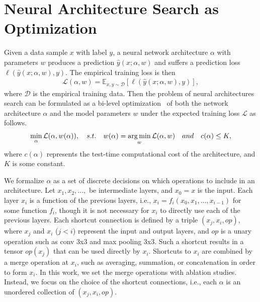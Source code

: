 \section{Neural Architecture Search as Optimization}

Given a data sample $x$ with label $y$, a neural network architecture $\alpha$ with parameters $w$ produces 
a prediction $\hat{y}(x ; \alpha, w)$ and suffers a prediction loss $\ell(\hat{y}(x ; \alpha, w), y)$.
The empirical training loss is then 
\begin{align}
\mathcal{L}(\alpha, w) = \mathbb{E} _{x, y \sim \mathcal{D}} [ \ell(\hat{y}(x ; \alpha, w), y) ] ,
\end{align}
where $\mathcal{D}$ is the empirical training data. 
Then the problem of neural architectures search can be formulated as a bi-level optimization~\citep{bilevel_opt}
of both the network architecture $\alpha$ and the model parameters $w$ under the expected training loss $\mathcal{L}$ 
as follows.
\begin{align}
\min _{\alpha} \mathcal{L} (\alpha, w(\alpha)),
\quad
s.t. \quad w(\alpha) = \operatorname*{arg\,min} _w \mathcal{L} (\alpha, w) 
\quad and \quad c(\alpha) \leq K,
\label{eq:bilevel_nas}
\end{align}
where $c(\alpha)$ represents the test-time computational cost of the architecture, and $K$ is some constant. 

We formalize $\alpha$ as a set of discrete decisions on which operations to include in an architecture.
Let $x_1, x_2,...,$ be intermediate layers, and $x_0 = x$ is the input. Each layer $x_i$ is a function
of the previous layers, i.e., $x_{i} = f_i ( x_0, x_1,..., x_{i-1})$ for some function $f_i$, 
though it is not necessary for $x_i$ to directly use each of the previous layers.
Each shortcut connection is defined by a triple $(x_{j}, x_{i}, op)$, 
where $x_j$ and $x_i$ ($j < i$) represent the input and output layers, and $op$ is a unary operation such 
as conv 3x3 and max pooling 3x3. Such a shortcut results in a tensor $op(x_{j})$ that can be used directly by 
$x_i$. Shortcuts to $x_i$ are combined by a merge operation 
at $x_i$, such as averaging, summation, or concatenation in order to form $x_i$.
In this work, we set the merge operations with ablation studies. 
Instead, we focus on the choice of the shortcut connections, i.e., each $\alpha$ is 
an unordered collection of $(x_j, x_i, op)$. 

                   
                   
                   
                                                                         
